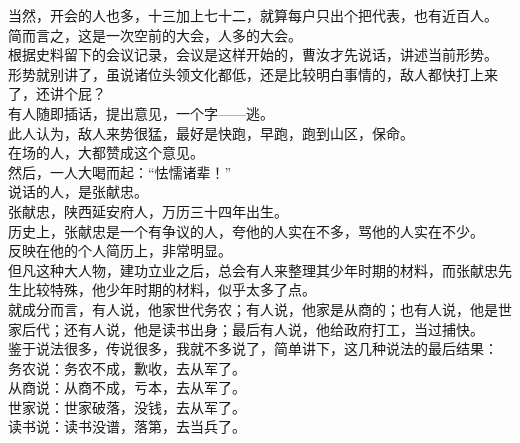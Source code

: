 \begin{multicols}{\theparacolNo}
当然，开会的人也多，十三加上七十二，就算每户只出个把代表，也有近百人。\\

简而言之，这是一次空前的大会，人多的大会。\\

根据史料留下的会议记录，会议是这样开始的，曹汝才先说话，讲述当前形势。\\

形势就别讲了，虽说诸位头领文化都低，还是比较明白事情的，敌人都快打上来了，还讲个屁？\\

有人随即插话，提出意见，一个字——逃。\\

此人认为，敌人来势很猛，最好是快跑，早跑，跑到山区，保命。\\

在场的人，大都赞成这个意见。\\

然后，一人大喝而起：“怯懦诸辈！”\\

说话的人，是张献忠。\\

张献忠，陕西延安府人，万历三十四年出生。\\

历史上，张献忠是一个有争议的人，夸他的人实在不多，骂他的人实在不少。\\

反映在他的个人简历上，非常明显。\\

但凡这种大人物，建功立业之后，总会有人来整理其少年时期的材料，而张献忠先生比较特殊，他少年时期的材料，似乎太多了点。\\

就成分而言，有人说，他家世代务农；有人说，他家是从商的；也有人说，他是世家后代；还有人说，他是读书出身；最后有人说，他给政府打工，当过捕快。\\

鉴于说法很多，传说很多，我就不多说了，简单讲下，这几种说法的最后结果：\\

务农说：务农不成，歉收，去从军了。\\

从商说：从商不成，亏本，去从军了。\\

世家说：世家破落，没钱，去从军了。\\

读书说：读书没谱，落第，去当兵了。\\


\end{multicols}
